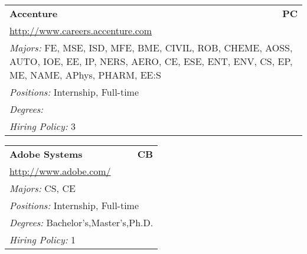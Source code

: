 \documentclass[twoside]{article}
\begin{document}
\begin{center}
\begin{multicols}{3}
\begin{FlushLeft}
\begin{minipage}{\columnwidth}
\end{minipage}
 
\begin{minipage}{\columnwidth}\begin{tabularx}{.95\columnwidth}{Xr}
                 {\Large\bf Accenture} & {\Large\bf PC}\\
    \multicolumn{2}{p{.95\columnwidth}}{\url{http://www.careers.accenture.com}}\\
    \multicolumn{2}{p{.95\columnwidth}}{\emph{Majors:} FE, MSE, ISD, MFE, BME, CIVIL, ROB, CHEME, AOSS, AUTO, IOE, EE, IP, NERS, AERO, CE, ESE, ENT, ENV, CS, EP, ME, NAME, APhys, PHARM, EE:S}\\
    \multicolumn{2}{p{.95\columnwidth}}{\emph{Positions:} Internship, Full-time}\\
    \multicolumn{2}{p{.95\columnwidth}}{\emph{Degrees:} }\\
    \multicolumn{2}{p{.95\columnwidth}}{\emph{Hiring Policy:} 3}\\
    \end{tabularx}
    
\end{minipage}
 
\begin{minipage}{\columnwidth}\begin{tabularx}{.95\columnwidth}{Xr}
                 {\Large\bf Adobe Systems} & {\Large\bf CB}\\
    \multicolumn{2}{p{.95\columnwidth}}{\url{http://www.adobe.com/}}\\
    \multicolumn{2}{p{.95\columnwidth}}{\emph{Majors:} CS, CE}\\
    \multicolumn{2}{p{.95\columnwidth}}{\emph{Positions:} Internship, Full-time}\\
    \multicolumn{2}{p{.95\columnwidth}}{\emph{Degrees:} Bachelor's,Master's,Ph.D.}\\
    \multicolumn{2}{p{.95\columnwidth}}{\emph{Hiring Policy:} 1}\\
    \end{tabularx}
    
\end{minipage}
 

\end{FlushLeft}
\end{multicols}
\end{center}
\end{document}
